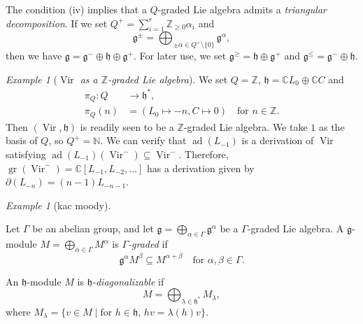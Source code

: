 \documentclass[a4paper, 12pt, reqno]{amsart}
\theoremstyle{remark}
\newtheorem{example}[theorem]{Example}
\DeclareMathOperator{\Vir}{Vir}
\DeclareMathOperator{\gr}{gr}
\DeclareMathOperator{\ad}{ad}
\begin{document}
The condition (iv) implies that a $Q$-graded Lie algebra admits a \emph{triangular decomposition}.
If we set $Q^+ = \sum_{i = 1}^r\mathbb{Z}_{\ge 0}\alpha_i$ and
\begin{equation*}
  \mathfrak{g}^{\pm} = \bigoplus_{\pm \alpha \in Q^+ \setminus \{0\}}\mathfrak{g}^{\alpha},
\end{equation*}
then we have $\mathfrak{g} = \mathfrak{g}^- \oplus \mathfrak{h} \oplus \mathfrak{g}^+$.
For later use, we set $\mathfrak{g}^{\ge} = \mathfrak{h} \oplus \mathfrak{g}^+$ and $\mathfrak{g}^{\le} = \mathfrak{g}^- \oplus \mathfrak{h}$.

\begin{example}[\emph{$\Vir$ as a $\mathbb{Z}$-graded Lie algebra}]
  \label{exa:2}
  We set $Q = \mathbb{Z}$, $\mathfrak{h} = \mathbb{C}L_0 \oplus \mathbb{C}C$ and
  \begin{align*}
    \pi_Q: Q &\to \mathfrak{h}^*, \\
    \pi_Q(n) &= (L_0 \mapsto -n, C \mapsto 0) \quad \text{for $n \in \mathbb{Z}$}.
  \end{align*}
  Then $(\Vir, \mathfrak{h})$ is readily seen to be a $\mathbb{Z}$-graded Lie algebra.
  We take $1$ as the basis of $Q$, so $Q^+ = \mathbb{N}$.
  We can verify that $\ad(L_{-1})$ is a derivation of $\Vir$ satisfying $\ad(L_{-1})(\Vir^-) \subseteq \Vir^-$.
  Therefore, $\gr(\Vir^-) = \mathbb{C}[L_{-1}, L_{-2}, \dots]$ has a derivation given by $\partial(L_{-n}) = (n - 1)L_{-n - 1}$.
\end{example}

\begin{example}[kac moody]
  \label{exa:7}
  
\end{example}

Let $\Gamma$ be an abelian group, and let $\mathfrak{g} = \bigoplus_{\alpha \in \Gamma}\mathfrak{g}^{\alpha}$ be a $\Gamma$-graded Lie algebra.
A $\mathfrak{g}$-module $M = \bigoplus_{\alpha \in \Gamma}M^{\alpha}$ is \emph{$\Gamma$-graded} if
\begin{equation*}
  \mathfrak{g}^{\alpha}M^{\beta} \subseteq M^{\alpha + \beta} \quad \text{for $\alpha, \beta \in \Gamma$}.
\end{equation*}

An $\mathfrak{h}$-module $M$ is \emph{$\mathfrak{h}$-diagonalizable} if
\begin{equation*}
  M = \bigoplus_{\lambda \in \mathfrak{h}^*}M_{\lambda},
\end{equation*}
where $M_{\lambda} = \{v \in M \mid \text{for $h \in \mathfrak{h}$, $hv = \lambda(h)v$}\}$.
\end{document}
